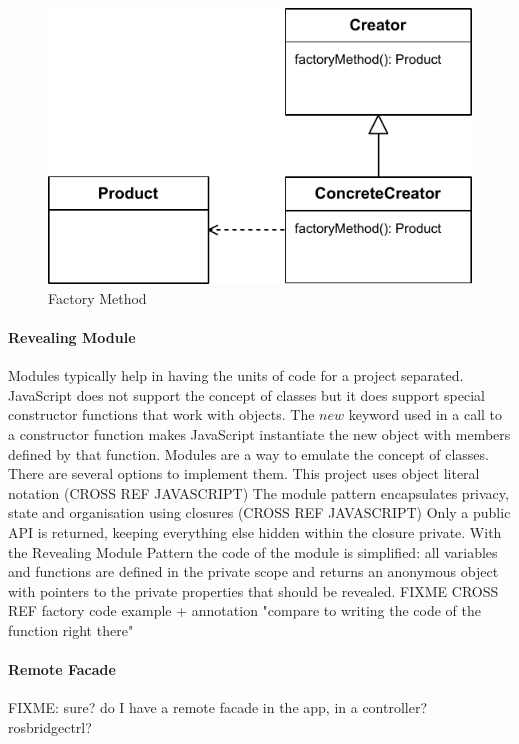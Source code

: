 \begin{figure}[htb]
    \centering
    \includegraphics{figures/design-patterns-factory.pdf}
    \caption{Factory Method}
    \label{fig:design-patterns-factory0}
\end{figure}






\paragraph{Revealing Module} \cite{Osmani:2012} Modules typically help in having the units of code for a project separated.
JavaScript does not support the concept of classes but it does support special constructor functions that work with objects. 
The $new$ keyword used in a call to a constructor function makes JavaScript instantiate the new object with members defined by that function.
Modules are a way to emulate the concept of classes.
There are several options to implement them. 
This project uses object literal notation (CROSS REF JAVASCRIPT)
The module pattern encapsulates privacy, state and organisation using closures (CROSS REF JAVASCRIPT)
Only a public \ac{API} is returned, keeping everything else hidden within the closure private.
With the Revealing Module Pattern the code of the module is simplified: all variables and functions are defined in the private scope and returns an anonymous object with pointers to the private properties that should be revealed.
FIXME CROSS REF factory code example  + annotation "compare to writing the code of the function right there"

\paragraph{Remote Facade} FIXME: sure? do I have a remote facade in the app, in a controller? rosbridgectrl?

